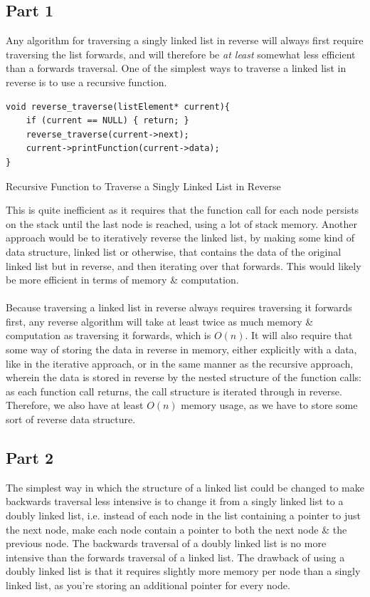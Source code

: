\documentclass[a4paper]{article}
\newenvironment{code}{\captionsetup{type=listing, skip=0pt}}{}
\begin{document}
\subsection{Part 1}
Any algorithm for traversing a singly linked list in reverse will always first require traversing the list forwards, and will therefore be \emph{at least} somewhat
less efficient than a forwards traversal.
One of the simplest ways to traverse a linked list in reverse is to use a recursive function.
\begin{code}
\begin{verbatim}
void reverse_traverse(listElement* current){
    if (current == NULL) { return; }
    reverse_traverse(current->next);
    current->printFunction(current->data);
}
\end{verbatim}
\caption{Recursive Function to Traverse a Singly Linked List in Reverse}
\end{code}

This is quite inefficient as it requires that the function call for each node persists on the stack until the last node is reached, using a lot of stack memory.
Another approach would be to iteratively reverse the linked list, by making some kind of data structure, linked list or otherwise, that contains the data of the 
original linked list but in reverse, and then iterating over that forwards.  
This would likely be more efficient in terms of memory \& computation.
\\\\
Because traversing a linked list in reverse always requires traversing it forwards first, any reverse algorithm will take at least twice as much memory \& computation
as traversing it forwards, which is $O(n)$.
It will also require that some way of storing the data in reverse in memory, either explicitly with a data, like in the iterative approach, or in the same manner 
as the recursive approach, wherein the data is stored in reverse by the nested structure of the function calls: as each function call returns, the call structure 
is iterated through in reverse.
Therefore, we also have at least $O(n)$ memory usage, as we have to store some sort of reverse data structure.

\subsection{Part 2}
The simplest way in which the structure of a linked list could be changed to make backwards traversal less intensive is to change it from a singly linked list to a 
doubly linked list, i.e. instead of each node in the list containing a pointer to just the next node, make each node contain a pointer to both the next node \& the 
previous node.
The backwards traversal of a doubly linked list is no more intensive than the forwards traversal of a linked list.
The drawback of using a doubly linked list is that it requires slightly more memory per node than a singly linked list, as you're storing an additional pointer 
for every node.
\end{document}
